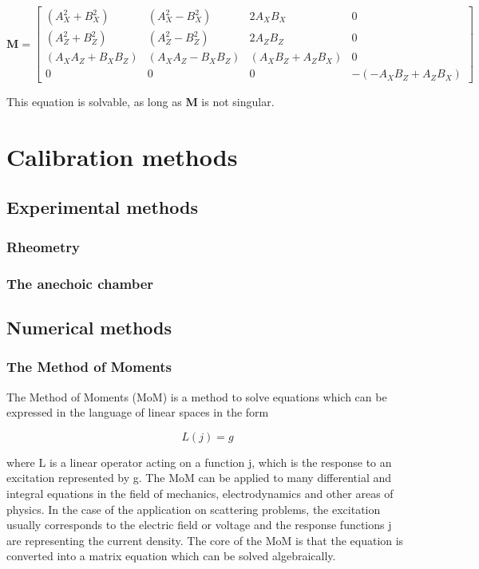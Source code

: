 \documentclass[a4paper,11pt]{report}
\begin{document}
\tiny
\begin{equation}
\textbf{M}= \left[
\begin{array}{cccc}
(A^2_X+ B^2_X) & (A^2_X- B^2_X) & 2 A_X B_X & 0 \\
(A^2_Z+ B^2_Z) &(A^2_Z- B^2_Z)  & 2 A_Z B_Z & 0 \\
 (A_X A_Z +  B_X B_Z)& (A_X A_Z - B_X B_Z) & (A_X B_Z + A_Z B_X) & 0 \\
0 & 0 & 0 & -(-A_X B_Z + A_Z B_X )
\end{array} \right]
\end{equation}
\normalsize

This equation is solvable, as long as \textbf{M} is not singular.


\chapter{Calibration methods}
\section{Experimental methods}
\subsection{Rheometry}
\subsection{The anechoic chamber}
\section{Numerical methods}
\subsection{The Method of Moments}
The Method of Moments (MoM) is a method to solve equations which can be expressed in the language of linear spaces in the form

\begin{equation}\label{eq:linear_operator}
 L(j)=g
\end{equation}

where L is a linear operator acting on a function j, which is the response to an excitation represented by g. The MoM can be applied to many differential and integral equations in the field of mechanics, electrodynamics and other areas of physics. In the case of the application on scattering problems, the excitation usually corresponds to the electric field or voltage and the response functions j are representing the current density. The core of the MoM is that the equation is converted into a matrix equation which can be solved algebraically.\\
\end{document}
